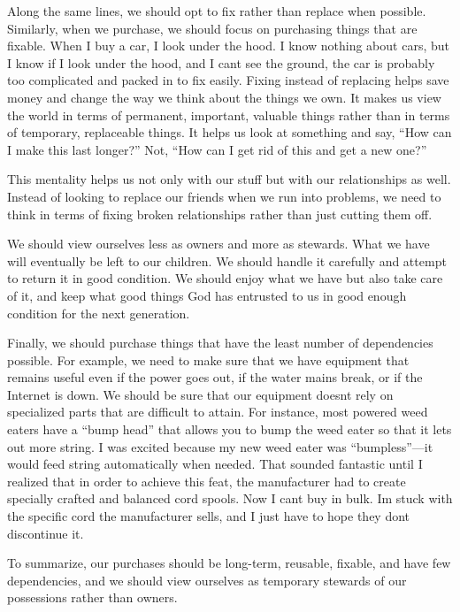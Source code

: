 Along the same lines, we should opt to fix rather than replace when
possible. Similarly, when we purchase, we should focus on purchasing
things that are fixable. When I buy a car, I look under the hood. I
know nothing about cars, but I know if I look under the hood, and I
can{\textquotesingle}t see the ground, the car is probably too
complicated and packed in to fix easily. Fixing instead of replacing
helps save money and
change the way we think about the things we own. It makes us view the
world in terms of permanent, important, valuable things rather than in
terms of temporary, replaceable things. It helps us look at
something and say,
“How can I make this last longer?” Not, “How can I get rid of this and
get a new one?”  

This mentality helps us not only with our
stuff but
with our
relationships as well. Instead of looking to replace our friends when
we run into problems,
we need to think in
terms of fixing broken relationships rather than just cutting them
off.

We should view ourselves less as owners and more as stewards. What we
have will eventually be left to our children. We should handle it
carefully and attempt to return it in good condition. We should enjoy
what we have but also take care of it, and keep what good things God
has entrusted to us in good enough condition for the next generation.

Finally, we should purchase things that have the least number of
dependencies possible.
For example, we need
to make sure that we have equipment that remains useful even if the
power goes out, if the water mains break, or if the Internet is down.
We should be sure that our equipment doesn{\textquotesingle}t rely on
specialized parts that are difficult to attain. For instance, most
powered weed eaters have a “bump head” that allows you to bump the weed
eater so that it lets out more string. I was excited because my new
weed eater was “bumpless”—it would feed string automatically when
needed. That sounded fantastic until I realized that in order to
achieve this feat, the manufacturer had to create specially crafted and
balanced cord spools. Now I can{\textquotesingle}t buy in bulk.
I{\textquotesingle}m stuck with the specific cord the manufacturer
sells, and I just have to hope they don{\textquotesingle}t discontinue
it.

To summarize, our purchases should be long-term, reusable, fixable, and
have few dependencies, and we should view ourselves as temporary
stewards of our possessions rather than owners.
